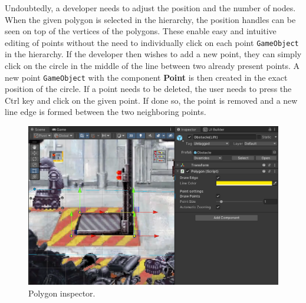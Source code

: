 Undoubtedly, a developer needs to adjust the position and the number of nodes. When the given polygon is selected in the hierarchy, the position handles can be seen on top of the vertices of the polygons. These enable easy and intuitive editing of points without the need to individually click on each point \verb|GameObject| in the hierarchy. If the developer then wishes to add a new point, they can simply click on the circle in the middle of the line between two already present points. A new point \verb|GameObject| with the component \textbf{Point} is then created in the exact position of the circle. If a point needs to be deleted, the user needs to press the Ctrl key and click on the given point. If done so, the point is removed and a new line edge is formed between the two neighboring points.
\begin{figure}[H]
\centering
\includegraphics[width=1\linewidth]{img/User doc/polygon.png}
\caption{Polygon inspector.}
\label{fig:Manual-Polygon}
\end{figure}

